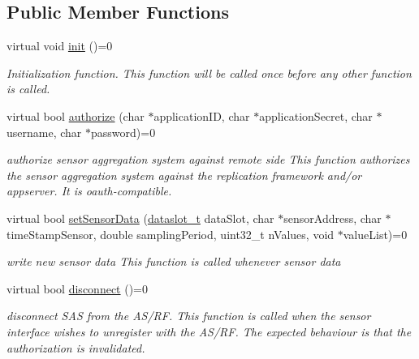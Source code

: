 \subsection*{Public Member Functions}
\begin{DoxyCompactItemize}
\item 
\hypertarget{classhe2mt_s_d_i_a6a3b5da850e0571bc4a8c8e0de7ad9e8}{virtual void \hyperlink{classhe2mt_s_d_i_a6a3b5da850e0571bc4a8c8e0de7ad9e8}{init} ()=0}\label{classhe2mt_s_d_i_a6a3b5da850e0571bc4a8c8e0de7ad9e8}

\begin{DoxyCompactList}\small\item\em Initialization function. This function will be called once before any other function is called. \end{DoxyCompactList}\item 
virtual bool \hyperlink{classhe2mt_s_d_i_ae5212f96e535b795b11fd34a89a3d616}{authorize} (char $\ast$application\-I\-D, char $\ast$application\-Secret, char $\ast$username, char $\ast$password)=0
\begin{DoxyCompactList}\small\item\em authorize sensor aggregation system against remote side This function authorizes the sensor aggregation system against the replication framework and/or appserver. It is oauth-\/compatible. \end{DoxyCompactList}\item 
virtual bool \hyperlink{classhe2mt_s_d_i_a775fcd2c08e923050b76aa750895a983}{set\-Sensor\-Data} (\hyperlink{classhe2mt_s_d_i_ad0bd9136f18c52d27b93cfca85bf05dd}{dataslot\-\_\-t} data\-Slot, char $\ast$sensor\-Address, char $\ast$time\-Stamp\-Sensor, double sampling\-Period, uint32\-\_\-t n\-Values, void $\ast$value\-List)=0
\begin{DoxyCompactList}\small\item\em write new sensor data This function is called whenever sensor data \end{DoxyCompactList}\item 
virtual bool \hyperlink{classhe2mt_s_d_i_a7f9d573e91544cc1436dab6bf1a889cf}{disconnect} ()=0
\begin{DoxyCompactList}\small\item\em disconnect S\-A\-S from the A\-S/\-R\-F. This function is called when the sensor interface wishes to unregister with the A\-S/\-R\-F. The expected behaviour is that the authorization is invalidated. \end{DoxyCompactList}\item 

\end{DoxyCompactItemize}
